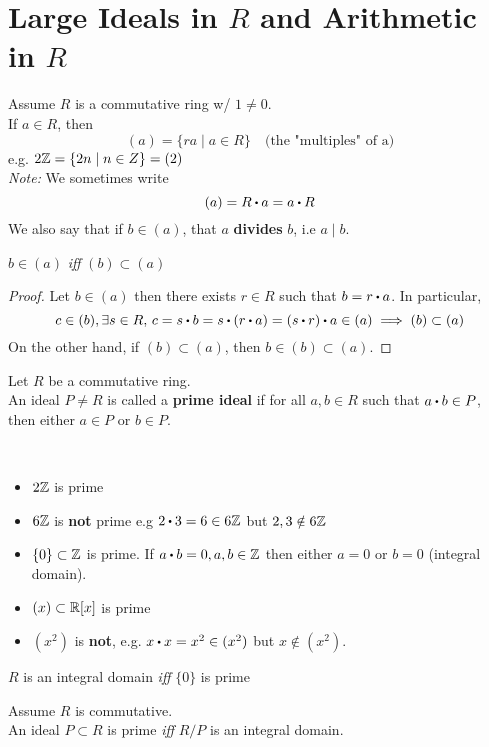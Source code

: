 \documentclass[../Main.tex]{subfiles}
\begin{document}
\section*{Large Ideals in \texorpdfstring{$R$}{TEXT} and Arithmetic in \texorpdfstring{$R$}{TEXT}}
Assume $R$ is a commutative ring w/ $1\ne 0$. \\
If $a\in R$, then
\[(a)=\{ra\mid a\in R\} \quad \text{(the "multiples" of a)}\]
e.g. $2\mathbb{Z}=\{2n\mid n\in Z\}=(2)$\\
\textit{Note:} We sometimes write
\[(a)=R\rdot a=a\rdot R\]
We also say that if $b\in (a)$, that $a$ \textbf{divides} $b$, i.e $a\mid b$.
\begin{claim}
	$b\in (a)$ \textit{iff} $(b) \subset (a)$
\end{claim}
\begin{proof}
	Let $b\in (a)$ then there exists $r\in R$ such that $b=r\rdot a$. In particular,
	\[c\in (b), \exists s\in R, \, c=s\rdot b=s\rdot (r\rdot a)=(s\rdot r)\rdot a\in (a)\implies (b) \subset (a)\]
	On the other hand, if $(b)\subset (a)$, then $b\in (b) \subset (a)$.
\end{proof}
\begin{dfn}[title = Prime Ideal]
	Let $R$ be a commutative ring.\\
	An ideal $P\ne R$ is called a \textbf{prime ideal} if for all $a,b\in R$ such that $a\rdot b\in P$, then either $a\in P$ or $b\in P$.
\end{dfn}
\newpage
\begin{example}~
\begin{itemize}
	\item$2\mathbb{Z}$ is prime
	\item$6\mathbb{Z}$ is \textbf{not} prime e.g $2\rdot 3 = 6 \in 6\Z$ but $2,3\notin 6\mathbb{Z}$
	\item $\{0\} \subset \mathbb{Z}$ is prime. If $a\rdot b=0, a,b \in \Z$ then either $a=0$ or $b=0$ (integral domain).
	\item $(x)\subset \mathbb{R}[x]$ is prime
	\item $(x^2)$ is \textbf{not}, e.g. $x\rdot x=x^2\in (x^2)$ but $x\notin (x^2)$.
\end{itemize}
\end{example}
\begin{prop}[title = \texorpdfstring{$R$}{R} integral if \texorpdfstring{$\{0\}$}{\{0\}} prime]
	$R$ is an integral domain \textit{iff} $\{0\}$ is prime
\end{prop}
\begin{thm}[title = Prime Ideal \texorpdfstring{$\Longleftrightarrow R/P$}{R/P} integral domain]
	Assume $R$ is commutative.\\
	An ideal $P\subset R$ is prime \textit{iff} $R/P$ is an integral domain.
\end{thm}
\end{document}
